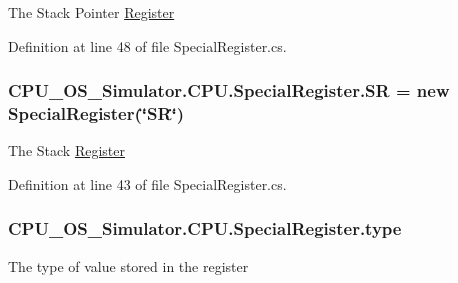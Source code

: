 The Stack Pointer \hyperlink{class_c_p_u___o_s___simulator_1_1_c_p_u_1_1_register}{Register} 



Definition at line 48 of file Special\+Register.\+cs.

\hypertarget{class_c_p_u___o_s___simulator_1_1_c_p_u_1_1_special_register_a556243e1c3c891e685bf884771c1575c}{}
\subsubsection[{S\+R}]{ C\+P\+U\+\_\+\+O\+S\+\_\+\+Simulator.\+C\+P\+U.\+Special\+Register.\+S\+R = new {\bf Special\+Register}(\char`\"{}S\+R\char`\"{})\hspace{0.3cm}{\ttfamily [static]}}\label{class_c_p_u___o_s___simulator_1_1_c_p_u_1_1_special_register_a556243e1c3c891e685bf884771c1575c}


The Stack \hyperlink{class_c_p_u___o_s___simulator_1_1_c_p_u_1_1_register}{Register} 



Definition at line 43 of file Special\+Register.\+cs.

\hypertarget{class_c_p_u___o_s___simulator_1_1_c_p_u_1_1_special_register_aae2bca6c1354013cca156bd19c30640d}{}
\subsubsection[{type}]{ C\+P\+U\+\_\+\+O\+S\+\_\+\+Simulator.\+C\+P\+U.\+Special\+Register.\+type\hspace{0.3cm}{\ttfamily [private]}}\label{class_c_p_u___o_s___simulator_1_1_c_p_u_1_1_special_register_aae2bca6c1354013cca156bd19c30640d}


The type of value stored in the register 

